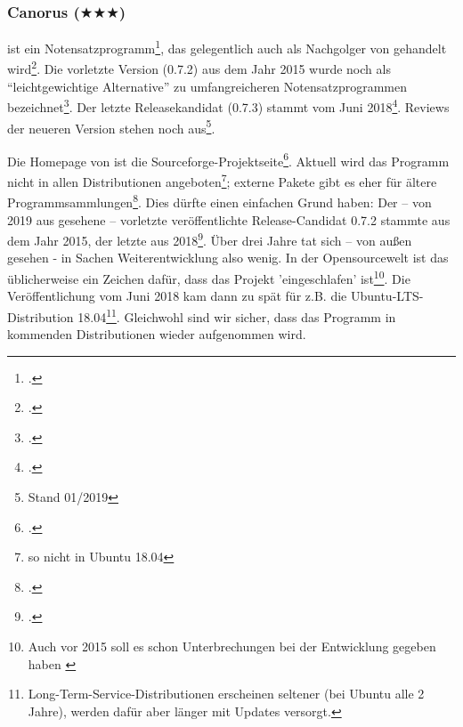%
%
%



\subsubsection{Canorus ($\bigstar$$\bigstar$$\bigstar$)}

 ist ein Notensatzprogramm\footcite[vgl.][\nopage
wp]{Canorus2019a}, das gelegentlich auch als Nachgolger von 
gehandelt wird\footcite[vgl.][\nopage wp]{WpedCanorus2019a}. Die vorletzte
Version (0.7.2) aus dem Jahr 2015 wurde noch als \enquote{leichtgewichtige
Alternative} zu umfangreicheren Notensatzprogrammen
bezeichnet\footcite[vgl.][\nopage wp]{Kreussel2015a}. Der letzte Releasekandidat
(0.7.3) stammt vom Juni 2018\footcite[vgl.][\nopage wp]{Canorus2019b}. Reviews
der neueren Version stehen noch aus\footnote{Stand 01/2019}.

Die Homepage von  ist die
Sourceforge-Projektseite\footcite[vgl.][\nopage wp]{Canorus2019a}. Aktuell wird
das Programm nicht in allen Distributionen angeboten\footnote{so nicht in Ubuntu
18.04}; externe Pakete gibt es eher für ältere
Programmsammlungen\footcite[vgl.][\nopage wp]{RepoCanorus2019a}. Dies dürfte
einen einfachen Grund haben: Der -- von 2019 aus gesehene -- vorletzte
veröffentlichte Release-Candidat 0.7.2 stammte aus dem Jahr 2015, der letzte aus
2018\footcite[vgl.][\nopage wp]{Canorus2019b}. Über drei Jahre tat sich -- von
außen gesehen - in Sachen Weiterentwicklung also wenig. In der Opensourcewelt
ist das üblicherweise ein Zeichen dafür, dass das Projekt 'eingeschlafen'
ist\footnote{Auch vor 2015 soll es schon Unterbrechungen bei der Entwicklung
gegeben haben \cite[vgl.][\nopage wp]{UbuntuCanorus2014a}}. Die Veröffentlichung
vom Juni 2018 kam dann zu spät für z.B. die Ubuntu-LTS-Distribution
18.04\footnote{Long-Term-Service-Distributionen erscheinen seltener (bei Ubuntu
alle 2 Jahre), werden dafür aber länger mit Updates versorgt.}.
Gleichwohl sind wir sicher, dass das Programm in kommenden Distributionen wieder
aufgenommen wird.

